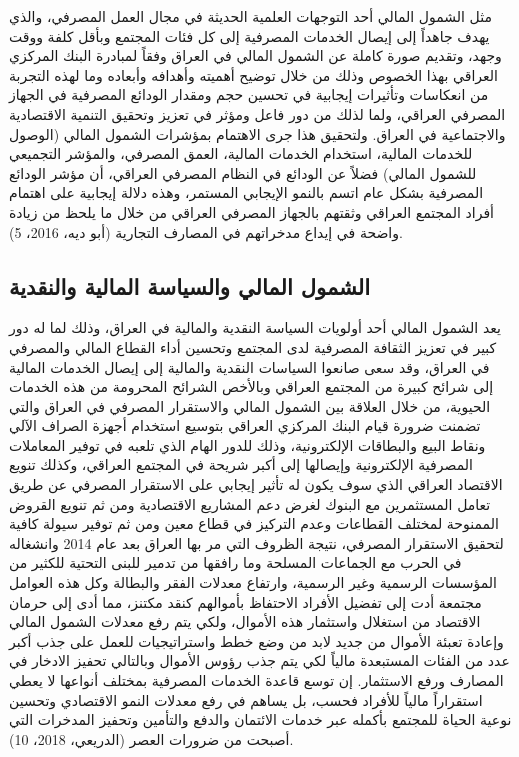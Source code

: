 \documentclass[10pt,a4paper]{report}
\begin{document}
\begin{doublespacing}
مثل الشمول المالي أحد التوجهات العلمية الحديثة في مجال العمل المصرفي، والذي يهدف جاهداً إلى إيصال الخدمات المصرفية إلى كل فئات المجتمع وبأقل كلفة ووقت وجهد، وتقديم صورة كاملة عن الشمول المالي في العراق وفقاً لمبادرة البنك المركزي العراقي بهذا الخصوص وذلك من خلال توضيح أهميته وأهدافه وأبعاده وما لهذه التجربة من انعكاسات وتأثيرات إيجابية في تحسين حجم ومقدار الودائع المصرفية في الجهاز المصرفي العراقي، ولما لذلك من دور فاعل ومؤثر في تعزيز وتحقيق التنمية الاقتصادية والاجتماعية في العراق. ولتحقيق هذا جرى الاهتمام بمؤشرات الشمول المالي ({الوصول للخدمات المالية، استخدام الخدمات المالية، العمق المصرفي، والمؤشر التجميعي للشمول المالي}) فضلاً عن الودائع في النظام المصرفي العراقي، أن مؤشر الودائع المصرفية بشكل عام اتسم بالنمو الإيجابي المستمر، وهذه دلالة إيجابية على اهتمام أفراد المجتمع العراقي وثقتهم بالجهاز المصرفي العراقي من خلال ما يلحظ من زيادة واضحة في إيداع مدخراتهم في المصارف التجارية ({أبو ديه، 2016، 5}).
\subsection{الشمول المالي والسياسة المالية والنقدية}
يعد الشمول المالي أحد أولويات السياسة النقدية والمالية في العراق، وذلك لما له دور كبير في تعزيز الثقافة المصرفية لدى المجتمع وتحسين أداء القطاع المالي والمصرفي في العراق، وقد سعى صانعوا السياسات النقدية والمالية إلى إيصال الخدمات المالية إلى شرائح كبيرة من المجتمع العراقي وبالأخص الشرائح المحرومة من هذه الخدمات الحيوية، من خلال العلاقة بين الشمول المالي والاستقرار المصرفي في العراق والتي تضمنت ضرورة قيام البنك المركزي العراقي بتوسيع استخدام أجهزة الصراف الآلي ونقاط البيع والبطاقات الإلكترونية، وذلك للدور الهام الذي تلعبه في توفير المعاملات المصرفية الإلكترونية وإيصالها إلى أكبر شريحة في المجتمع العراقي، وكذلك تنويع الاقتصاد العراقي الذي سوف يكون له تأثير إيجابي على الاستقرار المصرفي عن طريق تعامل المستثمرين مع البنوك لغرض دعم المشاريع الاقتصادية ومن ثم تنويع القروض الممنوحة لمختلف القطاعات وعدم التركيز في قطاع معين ومن ثم توفير سيولة كافية لتحقيق الاستقرار المصرفي، نتيجة الظروف التي مر بها العراق بعد عام 2014 وانشغاله في الحرب مع الجماعات المسلحة وما رافقها من تدمير للبنى التحتية للكثير من المؤسسات الرسمية وغير الرسمية، وارتفاع معدلات الفقر والبطالة وكل هذه العوامل مجتمعة أدت إلى تفضيل الأفراد الاحتفاظ بأموالهم كنقد مكتنز، مما أدى إلى حرمان الاقتصاد من استغلال واستثمار هذه الأموال، ولكي يتم رفع معدلات الشمول المالي وإعادة تعبئة الأموال من جديد لابد من وضع خطط واستراتيجيات للعمل على جذب أكبر عدد من الفئات المستبعدة مالياً لكي يتم جذب رؤوس الأموال وبالتالي تحفيز الادخار في المصارف ورفع الاستثمار. إن توسع قاعدة الخدمات المصرفية بمختلف أنواعها لا يعطي استقراراً مالياً للأفراد فحسب، بل يساهم في رفع معدلات النمو الاقتصادي وتحسين نوعية الحياة للمجتمع بأكمله عبر خدمات الائتمان والدفع والتأمين وتحفيز المدخرات التي أصبحت من ضرورات العصر ({الدريعي، 2018، 10}).


\end{doublespacing}
\end{document}
